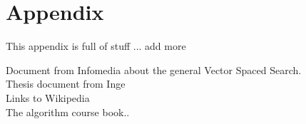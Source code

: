 \chapter{Appendix}

This appendix is full of stuff ... add more

Document from Infomedia about the general Vector Spaced Search.\\
Thesis document from Inge\\
Links to Wikipedia\\
The algorithm course book..